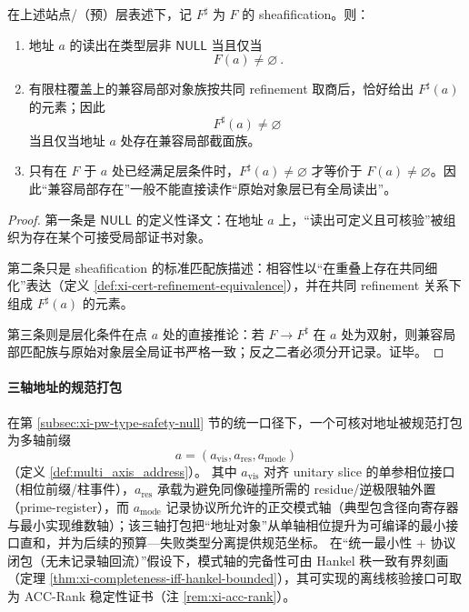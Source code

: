 \begin{proposition}\label{prop:cdim-nonnull-section-criterion}
在上述站点/（预）层表述下，记 \(F^\sharp\) 为 \(F\) 的 sheafification。则：
\begin{enumerate}
  \item 地址 \(a\) 的读出在类型层非 \(\mathsf{NULL}\) 当且仅当
  \[
  \boxed{\ F(a)\neq\varnothing\ }.
  \]
  \item 有限柱覆盖上的兼容局部对象族按共同 refinement 取商后，恰好给出 \(F^\sharp(a)\) 的元素；因此
  \[
  F^\sharp(a)\neq\varnothing
  \]
  当且仅当地址 \(a\) 处存在兼容局部截面族。
  \item 只有在 \(F\) 于 \(a\) 处已经满足层条件时，\(F^\sharp(a)\neq\varnothing\) 才等价于 \(F(a)\neq\varnothing\)。因此“兼容局部存在”一般不能直接读作“原始对象层已有全局读出”。
\end{enumerate}
\end{proposition}
\begin{proof}
第一条是 \(\mathsf{NULL}\) 的定义性译文：在地址 \(a\) 上，“读出可定义且可核验”被组织为存在某个可接受局部证书对象。
\par
第二条只是 sheafification 的标准匹配族描述：相容性以“在重叠上存在共同细化”表达（定义 \ref{def:xi-cert-refinement-equivalence}），并在共同 refinement 关系下组成 \(F^\sharp(a)\) 的元素。
\par
第三条则是层化条件在点 \(a\) 处的直接推论：若 \(F\to F^\sharp\) 在 \(a\) 处为双射，则兼容局部匹配族与原始对象层全局证书严格一致；反之二者必须分开记录。证毕。
\end{proof}

\paragraph{三轴地址的规范打包}
在第 \ref{subsec:xi-pw-type-safety-null} 节的统一口径下，一个可核对地址被规范打包为多轴前缀
\[
a=(a_{\mathrm{vis}},a_{\mathrm{res}},a_{\mathrm{mode}})
\]
（定义 \ref{def:multi_axis_address}）。
其中 \(a_{\mathrm{vis}}\) 对齐 unitary slice 的单参相位接口（相位前缀/柱事件），\(a_{\mathrm{res}}\) 承载为避免同像碰撞所需的 residue/逆极限轴外置（prime-register），而 \(a_{\mathrm{mode}}\) 记录协议所允许的正交模式轴（典型包含径向寄存器与最小实现维数轴）；该三轴打包把“地址对象”从单轴相位提升为可编译的最小接口直和，并为后续的预算—失败类型分离提供规范坐标。
在“统一最小性 + 协议闭包（无未记录轴回流）”假设下，模式轴的完备性可由 Hankel 秩一致有界刻画（定理 \ref{thm:xi-completeness-iff-hankel-bounded}），其可实现的离线核验接口可取为 ACC-Rank 稳定性证书（注 \ref{rem:xi-acc-rank}）。

